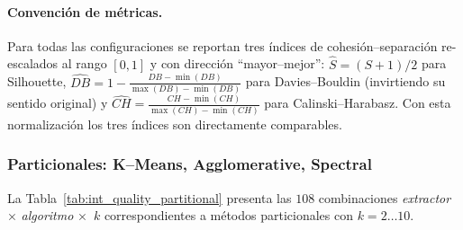 \paragraph{Convención de métricas.}
Para todas las configuraciones se reportan tres índices de cohesión–separación
re-escalados al rango \([0,1]\) y con dirección “mayor–mejor”:
\(\widehat S=(S+1)/2\) para Silhouette,
\(\widehat{DB}=1-\frac{DB-\min(DB)}{\max(DB)-\min(DB)}\) para Davies–Bouldin
(invirtiendo su sentido original) y
\(\widehat{CH}=\frac{CH-\min(CH)}{\max(CH)-\min(CH)}\) para Calinski–Harabasz.
Con esta normalización los tres índices son directamente comparables.

\subsubsection{Particionales: K–Means, Agglomerative, Spectral}

La Tabla~\ref{tab:int_quality_partitional} presenta las \(108\) combinaciones \textit{extractor} × \textit{algoritmo} ×~\(k\) correspondientes a métodos particionales con \(k=2\ldots10\).

